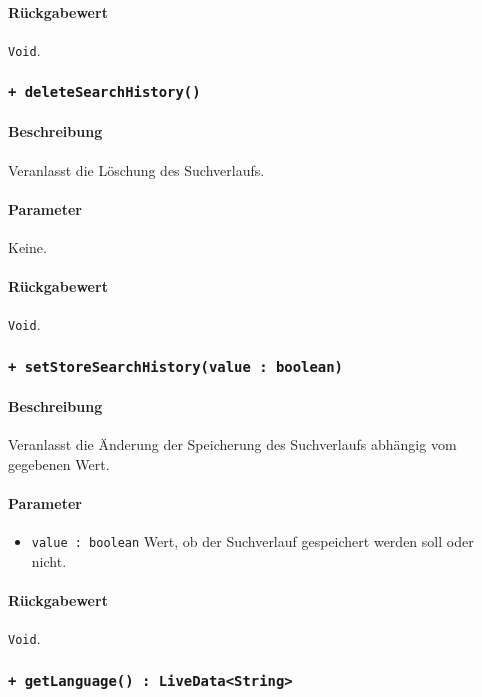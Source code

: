 \paragraph*{Rückgabewert}
\texttt{Void}.

\subsubsection*{\texttt{+ deleteSearchHistory()}}\label{App_Settings_ISettingsController_deleteSearchHistory}%
\paragraph*{Beschreibung}
Veranlasst die Löschung des Suchverlaufs.
\paragraph*{Parameter}
Keine.
\paragraph*{Rückgabewert}
\texttt{Void}.

\subsubsection*{\texttt{+ setStoreSearchHistory(value : boolean)}}\label{App_Settings_ISettingsController_setStoreSearchHistory}%
\paragraph*{Beschreibung}
Veranlasst die Änderung der Speicherung des Suchverlaufs abhängig vom gegebenen Wert.
\paragraph*{Parameter}
\begin{itemize}
    \item \texttt{value : boolean} Wert, ob der Suchverlauf gespeichert werden soll oder nicht.
\end{itemize}
\paragraph*{Rückgabewert}
\texttt{Void}.

\subsubsection*{\texttt{+ getLanguage() : LiveData<String>}}\label{App_Settings_ISettingsController_getLanguage}%

